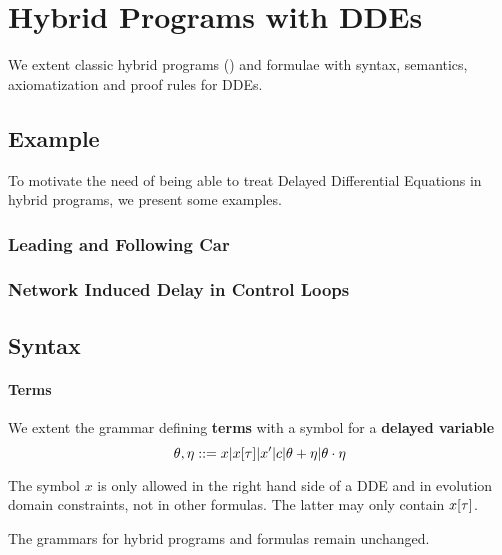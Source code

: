 \chapter{Hybrid Programs with DDEs}\label{hybrid-programs-with-ddes}

    We extent classic hybrid programs (\HP) and \dL formulae with syntax, semantics, axiomatization and proof rules for DDEs.

    \section{Example}
        \label{example-hp-cars}
        To motivate the need of being able to treat Delayed Differential Equations in hybrid programs, we present some examples.

        \subsection{Leading and Following Car}

        \subsection{Network Induced Delay in Control Loops}

    \section{Syntax}
        \label{sec:syntax}

        \subsubsection{Terms}
            \label{sec:terms}

            We extent the grammar defining \textbf{terms} with a symbol for a \textbf{delayed variable}
            \begin{equation}
                \theta,\eta ::= x|\xtau|x'|c|\theta+\eta|\theta\cdot\eta
            \end{equation}

            The symbol $x$ is only allowed in the right hand side of a DDE and in evolution domain constraints, not in other formulas. The latter may only contain $\xtau$.

    The grammars for hybrid programs and \dL formulas remain unchanged.


